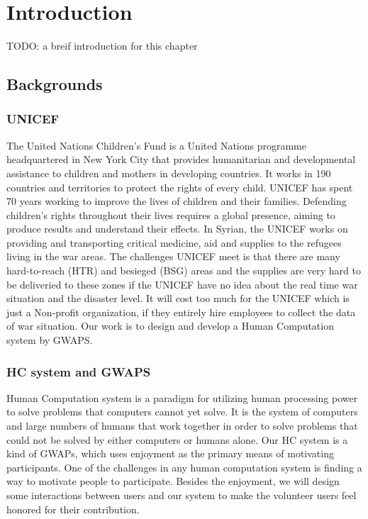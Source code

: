 \section{Introduction}

TODO: a breif introduction for this chapter

\subsection{Backgrounds}

\subsubsection{UNICEF}
  The United Nations Children's Fund\cite{unicef1994state} is a United Nations programme headquartered
  in New York City that provides humanitarian and developmental assistance to 
  children and mothers in developing countries. 
  It works in 190 countries and territories to protect the rights of every child. 
  UNICEF has spent 70 years working to improve the lives of children and their families. 
  Defending children's rights throughout their lives requires a global presence, 
  aiming to produce results and understand their effects. 
  In Syrian, the UNICEF works on providing and transporting critical medicine, 
  aid and supplies to the refugees living in the war areas. The challenges UNICEF meet is that 
  there are many hard-to-reach (HTR) and besieged (BSG) areas and the supplies are 
  very hard to be deliveried to these zones if the UNICEF have no idea about 
  the real time war situation and the disaster level. It will cost too much for the UNICEF 
  which is just a Non-profit organization, if they entirely hire employees to 
  collect the data of war situation. 
  Our work is to design and develop a Human Computation system by GWAPS\cite{lafourcade2015games}.

  \subsubsection{HC system and GWAPS}
  Human Computation system is a paradigm for utilizing human processing power to solve problems that 
  computers cannot yet solve\cite{quinn2011human}. 
  It is the system of computers and large numbers of humans that work together in order to solve problems that 
  could not be solved by either computers or humans alone\cite{quinn2009taxonomy}.
  Our HC system is a kind of GWAPs, which uses enjoyment as the primary means of motivating participants. 
  One of the challenges in any human computation system is finding a way to motivate people 
  to participate\cite{quinn2011human}. 
  Besides the enjoyment, we will design some interactions between users and our system to 
  make the volunteer users feel honored for their contribution.

